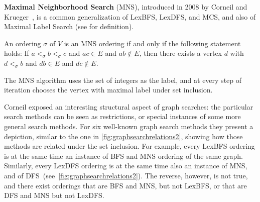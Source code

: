\documentclass{svproc}
\begin{document}
\vspace{2.5mm}\noindent\textbf{Maximal Neighborhood Search} (MNS), introduced in 2008 by Corneil and Krueger~\cite{corneil2008unified}, is a common generalization of LexBFS, LexDFS, and MCS, and also of Maximal Label Search (see \cite{Berry2009mls} for definition). 
\begin{definition}
\label{thm:mns-ordering-characterization}
An ordering $\sigma$ of $V$ is an MNS ordering if and only if the following
statement holds: If $a <_\sigma  b <_\sigma  c$ and $ac \in E$ and $ab \notin E$, then there exists a vertex $d$ with $d <_\sigma b$ and $db \in E$ and $dc\notin E$.
\end{definition}
The MNS algorithm uses the set of integers as the label, and at every step of iteration chooses the vertex with maximal label under set inclusion. 

Corneil \cite{corneil2008unified} exposed an interesting structural aspect of graph searches: the particular search methods can be seen as restrictions, or special instances of some more general search methods. For six well-known graph search methods they present a depiction, similar to the one in \cref{fig:graphsearchrelations2}, showing how those methods are related under the set inclusion.
For example, every LexBFS ordering is at the same time an instance of BFS and MNS ordering of the same graph. 
Similarly, every LexDFS ordering is at the same time also an instance of MNS, and of DFS~(see~\cref{fig:graphsearchrelations2}).
The reverse, however, is not true, and there exist orderings that are BFS and MNS, but not LexBFS, or that are DFS and MNS but not LexDFS.%
\end{document}
